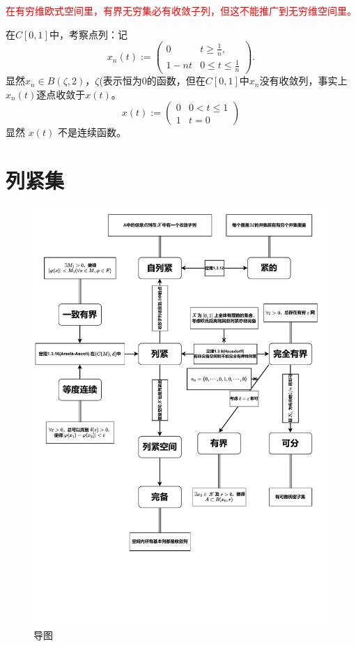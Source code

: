 \textcolor{red}{在有穷维欧式空间里，有界无穷集必有收敛子列，但这不能推广到无穷维空间里。}
\begin{example}
     在$C[0,1]$中，考察点列：记
    \begin{equation}
        \left.x_{n}\left(t\right):=\left(\begin{array}{ll}0&t\geq\frac{1}{n},\\1-nt&0\leq t\leq\frac{1}{n}\end{array}\right.\right). \nonumber
    \end{equation}
    显然$x_n\in B(\zeta, 2)$，$\zeta$(表示恒为0的函数，但在$C[0,1]$中$x_n$没有收敛列，事实上$x_{n}\left(t\right)$逐点收敛于$x\left(t\right)$。
    \begin{equation*}
        x(t) := \left(\begin{array}{ll}
            0 & 0<t\le 1 \\
            1 & t = 0
        \end{array}\right) 
    \end{equation*}
    显然 $x\left(t\right)$ 不是连续函数。
\end{example}

\newpage
\section{列紧集}
\begin{figure}[H]
    \centering
    \includegraphics[scale = 0.85, trim = {0cm, 5cm, 0.5cm, 0cm}, clip]{document/functional analysis_1.drawio.pdf}
    \caption{导图}
    \label{fig-1}
\end{figure}

